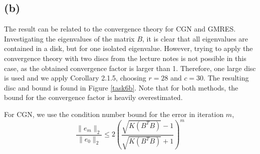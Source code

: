 \subsection{(b)}
The result can be related to the convergence theory for CGN and GMRES. Investigating the eigenvalues of the matrix $B$, it is clear that all eigenvalues are contained in a disk, but for one isolated eigenvalue. However, trying to apply the convergence theory with two discs from the lecture notes is not possible in this case, as the obtained convergence factor is larger than 1. Therefore, one large disc is used and we apply Corollary 2.1.5, choosing $r = 28$ and $c =30 $. The resulting disc and bound is found in Figure \ref{task6b}. Note that for both methods, the bound for the convergence factor is heavily overestimated. 

For CGN, we use the condition number bound for the error in iteration $m$, 
\begin{equation}
\frac{\|e_m\|_2}{\|e_0\|_2}\leq 2\left(\frac{\sqrt{K(B^TB)}-1}{\sqrt{K(B^TB)}+1}\right)^m
\end{equation}
